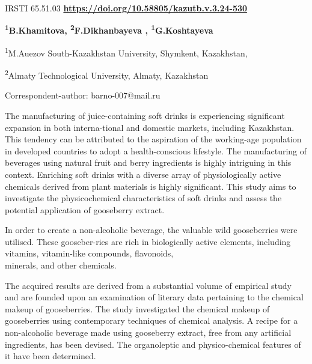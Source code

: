 \newpage
IRSTI 65.51.03
\hfill {\bfseries \href{https://doi.org/10.58805/kazutb.v.3.24-530}{https://doi.org/10.58805/kazutb.v.3.24-530}}

\begin{center}

{\bfseries \textsuperscript{1}B.Khamitova\envelope, \textsuperscript{2}F.Dikhanbayeva , \textsuperscript{1}G.Koshtayeva}

\textsuperscript{1}M.Auezov South-Kazakhstan University, Shymkent,
Kazakhstan,

\textsuperscript{2}Almaty Technological University, Almaty, Kazakhstan
\end{center}

\envelope Correspondent-author: barno-007@mail.ru\vspace{0.5cm}

The manufacturing of juice-containing soft drinks is experiencing
significant expansion in both interna-tional and domestic markets,
including Kazakhstan. This tendency can be attributed to the aspiration
of the working-age population in developed countries to adopt a
health-conscious lifestyle. The manufacturing of beverages using natural
fruit and berry ingredients is highly intriguing in this context.
Enriching soft drinks with a diverse array of physiologically active
chemicals derived from plant materials is highly significant. This study
aims to investigate the physicochemical characteristics of soft drinks
and assess the potential application of gooseberry extract.~

In order to create a non-alcoholic beverage, the valuable wild
gooseberries were utilised. These gooseber-ries are rich in biologically
active elements, including vitamins, vitamin-like compounds, flavonoids,
\\minerals, and other chemicals.~

The acquired results are derived from a substantial volume of empirical
study and are founded upon an examination of literary data pertaining to
the chemical makeup of gooseberries. The study investigated the chemical
makeup of gooseberries using contemporary techniques of chemical
analysis. A recipe for a non-alcoholic beverage made using gooseberry
extract, free from any artificial ingredients, has been devised. The
organoleptic and physico-chemical features of it have been determined.~

